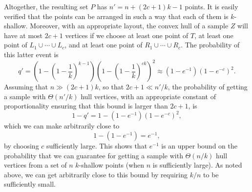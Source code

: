 \documentclass[11pt]{article}
\begin{document}
Altogether, the resulting set $P$ has $n'=n+(2c+1)k-1$ points. It is easily verified that the points can be arranged in such a way that each of them is $k$-shallow. Moreover, with an appropriate layout, the convex hull of a sample $Z$ will have at most $2c+1$ vertices if we choose at least one point of $T$, at least one point of $L_1\cup\cdots\cup L_c$, and at least one point of $R_1\cup\cdots\cup R_c$. The probability of this latter event is
$$
q' = \left(1 - \left(1-\frac{1}{k}\right)^{k-1}\right)
\left(1 - \left(1-\frac{1}{k}\right)^{ck}\right)^2 \approx
\left(1-e^{-1}\right) \left(1-e^{-c}\right)^2 .
$$
Assuming that $n \gg (2c+1)k$, so that $2c+1 \ll n'/k$, the probability of getting a sample with $\Theta(n'/k)$ hull vertices, with an appropriate constant of proportionality ensuring that this bound is larger than $2c+1$, is
$$
1 - q' = 1 - \left(1-e^{-1}\right) \left(1-e^{-c}\right)^2 ,
$$
which we can make arbitrarily close to
$$
1 - \left(1-e^{-1}\right) = e^{-1},
$$
by choosing $c$ sufficiently large. This shows that $e^{-1}$ is an upper bound on the probability that we can guarantee for getting a sample with $\Theta(n/k)$ hull vertices from a set of $n$ $k$-shallow points (when $n$ is sufficiently large). As noted above, we can get arbitrarily close to this bound by requiring $k/n$ to be sufficiently small.
\end{document}
